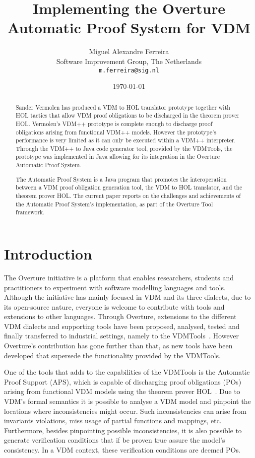 \documentclass[]{article}
\title{Implementing the Overture Automatic Proof System for VDM}
\author{Miguel Alexandre Ferreira\\
        Software Improvement Group, The Netherlands\\ 
		\texttt{m.ferreira@sig.nl}}
\date{\today}
\begin{document}
\maketitle
\begin{abstract}
Sander Vermolen has produced a VDM to HOL translator prototype together with HOL tactics that allow VDM proof obligations to be discharged in the theorem prover HOL.
Vermolen's VDM++ prototype is complete enough to discharge proof obligations arising from functional VDM++ models.
However the prototype's performance is very limited as it can only be executed within a VDM++ interpreter.
Through the VDM++ to Java code generator tool, provided by the VDMTools, the prototype was implemented in Java allowing for its integration in the Overture Automatic Proof System.

The Automatic Proof System is a Java program that promotes the interoperation between a VDM proof obligation generation tool, the VDM to HOL translator, and the theorem prover HOL.
The current paper reports on the challenges and achievements of the Automatic Proof System's implementation, as part of the Overture Tool framework.
\end{abstract}

\section{Introduction}
\label{sec:introduction}

The Overture initiative is a platform that enables researchers, students and practitioners to experiment with software modelling languages and tools.
Although the initiative has mainly focused in VDM and its three dialects, due to its open-source nature, everyone is welcome to contribute with tools and extensions to other languages.
Through Overture, extensions to the different VDM dialects and supporting tools have been proposed, analysed, tested and finally transferred to industrial settings, namely to the VDMTools~\cite{VDMTools}.
However Overture's contribution has gone further than that, as new tools have been developed that supersede the functionality provided by the VDMTools.

One of the tools that adds to the capabilities of the VDMTools is the Automatic Proof Support (APS), which is capable of discharging proof obligations (POs) arising from functional VDM models using the theorem prover HOL~\cite{HOL}.
Due to VDM's formal semantics it is possible to analyse a VDM model and pinpoint the locations where inconsistencies might occur.
Such inconsistencies can arise from invariants violations, miss usage of partial functions and mappings, etc.
Furthermore, besides pinpointing possible inconsistencies, it is also possible to generate verification conditions that if be proven true assure the model's consistency.
In a VDM context, these verification conditions are deemed POs.
\end{document}
